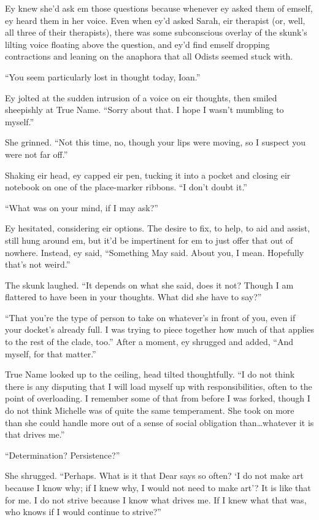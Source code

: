 Ey knew she'd ask em those questions because whenever ey asked them of emself, ey heard them in her voice. Even when ey'd asked Sarah, eir therapist (or, well, all three of their therapists), there was some subconscious overlay of the skunk's lilting voice floating above the question, and ey'd find emself dropping contractions and leaning on the anaphora that all Odists seemed stuck with.

``You seem particularly lost in thought today, Ioan.''

Ey jolted at the sudden intrusion of a voice on eir thoughts, then smiled sheepishly at True Name. ``Sorry about that. I hope I wasn't mumbling to myself.''

She grinned. ``Not this time, no, though your lips were moving, so I suspect you were not far off.''

Shaking eir head, ey capped eir pen, tucking it into a pocket and closing eir notebook on one of the place-marker ribbons. ``I don't doubt it.''

``What was on your mind, if I may ask?''

Ey hesitated, considering eir options. The desire to fix, to help, to aid and assist, still hung around em, but it'd be impertinent for em to just offer that out of nowhere. Instead, ey said, ``Something May said. About you, I mean. Hopefully that's not weird.''

The skunk laughed. ``It depends on what she said, does it not? Though I am flattered to have been in your thoughts. What did she have to say?''

``That you're the type of person to take on whatever's in front of you, even if your docket's already full. I was trying to piece together how much of that applies to the rest of the clade, too.'' After a moment, ey shrugged and added, ``And myself, for that matter.''

True Name looked up to the ceiling, head tilted thoughtfully. ``I do not think there is any disputing that I will load myself up with responsibilities, often to the point of overloading. I remember some of that from before I was forked, though I do not think Michelle was of quite the same temperament. She took on more than she could handle more out of a sense of social obligation than\ldots whatever it is that drives me.''

``Determination? Persistence?''

She shrugged. ``Perhaps. What is it that Dear says so often? `I do not make art because I know why; if I knew why, I would not need to make art'? It is like that for me. I do not strive because I know what drives me. If I knew what that was, who knows if I would continue to strive?''

